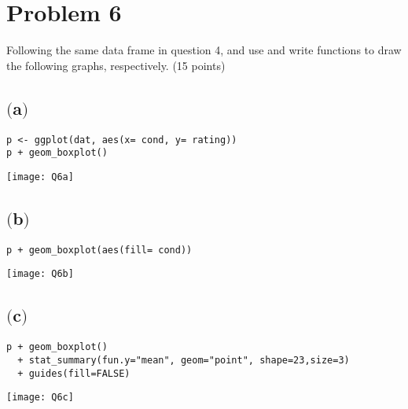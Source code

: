 \documentclass[a4paper,man,natbib]{apa6}
\begin{document}
\pagebreak
\section{Problem 6}
Following the same data frame in question 4, and use and write functions to draw the following graphs, respectively. (15 points) \\

\subsection{$($a$)$}
\begin{verbatim}
p <- ggplot(dat, aes(x= cond, y= rating))
p + geom_boxplot()
\end{verbatim}
\texttt{[image: Q6a]}

\subsection{$($b$)$}
\begin{verbatim}
p + geom_boxplot(aes(fill= cond))
\end{verbatim}
\texttt{[image: Q6b]}

\subsection{$($c$)$}
\begin{verbatim}
p + geom_boxplot() 
  + stat_summary(fun.y="mean", geom="point", shape=23,size=3) 
  + guides(fill=FALSE)
\end{verbatim}
\texttt{[image: Q6c]}
\end{document}
